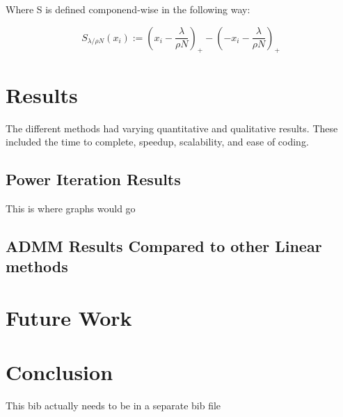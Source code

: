 \documentclass[letterpaper,12pt,onecolumn]{article}
\begin{document}
Where S is defined componend-wise in the following way:
\begin{center}
	\begin{equation}
	  S_{\lambda/\rho N}(x_{i}) := (x_{i} - \frac{\lambda}{\rho N})_{+} - (-x_{i} - \frac{\lambda}{\rho N})_{+}
	\end{equation}
\end{center}



\section{Results}
The different methods had varying quantitative and qualitative results. These included the time to complete, speedup, scalability, and ease of coding. 

\subsection{Power Iteration Results}
This is where graphs would go 


\subsection{ADMM Results Compared to other Linear methods}


\section{Future Work}


\section{Conclusion}

This bib actually needs to be in a separate bib file
\vfill\pagebreak








 
\end{document}
